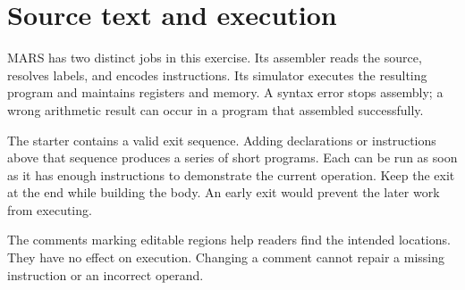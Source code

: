 \section{Source text and
  execution}\label{001-console-calculation-p01-source-text-and-execution}

MARS has two distinct jobs in this exercise. Its assembler reads the
source, resolves labels, and encodes instructions. Its simulator
executes the resulting program and maintains registers and memory. A
syntax error stops assembly; a wrong arithmetic result can occur in a
program that assembled successfully.

The starter contains a valid exit sequence. Adding declarations or
instructions above that sequence produces a series of short programs.
Each can be run as soon as it has enough instructions to demonstrate the
current operation. Keep the exit at the end while building the body. An
early exit would prevent the later work from executing.

The comments marking editable regions help readers find the intended
locations. They have no effect on execution. Changing a comment cannot
repair a missing instruction or an incorrect operand.
